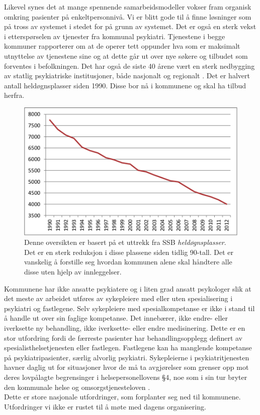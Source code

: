 \documentclass[11pt]{report} %
\begin{document}
    Likevel synes det at mange spennende samarbeidsmodeller vokser fram organisk omkring pasienter på enkeltpersonnivå. Vi er blitt gode til å finne løsninger som på tross av systemet i stedet for på grunn av systemet.
    Det er også en sterk vekst i etterspørselen av tjenester fra kommunal psykiatri. Tjenestene i begge kommuner rapporterer om at de operer tett oppunder hva som er maksimalt utnyttelse av tjenestene sine og at dette går ut over nye søkere og tilbudet som forventes i befolkningen.
    Det har også de siste 40 årene vært en sterk nedbygging av statlig psykiatriske institusjoner, både nasjonalt og regionalt
    \cite{SSButtrekk1}. Det er halvert antall heldøgnsplasser siden 1990. Disse bor nå i kommunene og skal ha tilbud herfra. 

  \begin{figure}[ht]
    \centering
    \includegraphics{heldgnpsykplass}
    \caption[Oversikt over reduksjon i  \textit{heldøgnsplasser}.]
     {Denne oversikten er basert på et uttrekk fra SSB \textit{heldøgnsplasser}. Det er en sterk reduksjon i disse plassene siden tidlig 90-tall. Det er vanskelig å forstille seg hvordan kommunen alene skal håndtere alle disse uten hjelp av innleggelser.}
  \end{figure}


      Kommunene har ikke ansatte psykiatere og i liten grad ansatt psykologer slik at det meste av arbeidet utføres av sykepleiere med eller uten spesialisering i psykiatri og fastlegene. Selv sykepleiere med spesialkompetanse er ikke i stand til å handle ut over sin faglige kompetanse. Det innebærer, ikke endre- eller iverksette ny behandling, ikke iverksette- eller endre medisinering. Dette er en stor utfordring fordi de færreste pasienter har behandlingsopplegg definert av spesialisthelsetjenesten eller fastlegen. Fastlegene kan ha manglende kompetanse på psykiatripasienter, særlig alvorlig psykiatri. 
      Sykepleierne i psykiatritjenesten havner daglig ut for situasjoner hvor de må ta avgjørelser som grenser opp mot deres lovpålagte begrensinger i helsepersonellovens §4, noe som i sin tur bryter den kommunale helse og omsorgstjenesteloven
      \cite{HOTJL-12}.\\
      Dette er store nasjonale utfordringer, som forplanter seg ned til kommunene. Utfordringer vi ikke er rustet til å møte med dagens organisering. \\
\end{document}
